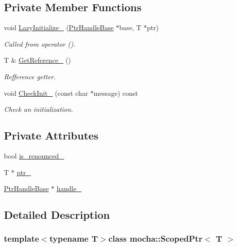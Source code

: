 \subsection*{Private Member Functions}
\begin{DoxyCompactItemize}
\item 
void \hyperlink{classmocha_1_1_scoped_ptr_a3c2d19dbccae1c443b97dcb2e3273eb5}{LazyInitialize\_\-} (\hyperlink{classmocha_1_1_ptr_handle_base}{PtrHandleBase} $\ast$base, T $\ast$ptr)
\begin{DoxyCompactList}\small\item\em Called from operator (). \end{DoxyCompactList}\item 
T \& \hyperlink{classmocha_1_1_scoped_ptr_aaa64577a6022d785dfe3a1d0cea9c0cf}{GetReference\_\-} ()
\begin{DoxyCompactList}\small\item\em Refference getter. \end{DoxyCompactList}\item 
void \hyperlink{classmocha_1_1_scoped_ptr_ab81480325720ae4701a115b13f19a58e}{CheckInit\_\-} (const char $\ast$message) const 
\begin{DoxyCompactList}\small\item\em Check an initialization. \end{DoxyCompactList}\end{DoxyCompactItemize}
\subsection*{Private Attributes}
\begin{DoxyCompactItemize}
\item 
bool \hyperlink{classmocha_1_1_scoped_ptr_a5d3dfc6f93047039ea2171969c570651}{is\_\-renounced\_\-}
\item 
T $\ast$ \hyperlink{classmocha_1_1_scoped_ptr_a7c8c96fcbc408b028846ecc2e5f43c32}{ptr\_\-}
\item 
\hyperlink{classmocha_1_1_ptr_handle_base}{PtrHandleBase} $\ast$ \hyperlink{classmocha_1_1_scoped_ptr_a41588f171549c4b28748ab324652c1f1}{handle\_\-}
\end{DoxyCompactItemize}


\subsection{Detailed Description}
\subsubsection*{template$<$typename T$>$class mocha::ScopedPtr$<$ T $>$}



